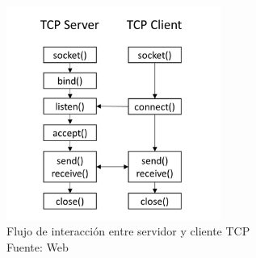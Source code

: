 





\begin{figure}[H]
    \begin{center}
        \includegraphics[width=7cm]{img/capitulo_2/tcp.png}
    \end{center}
    \caption{Flujo de interacción entre servidor y cliente TCP\\Fuente: Web}
    \label{fig:tcp_flow}
\end{figure}

